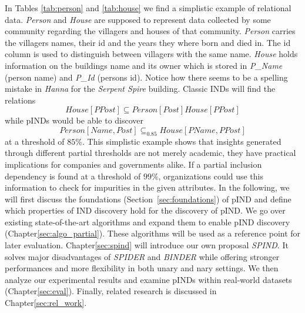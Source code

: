 In Tables \ref{tab:person} and \ref{tab:house} we find a simplistic example of relational data. \textit{Person} and \textit{House} are supposed to represent data collected by some community regarding the villagers and houses of that community. \textit{Person} carries the villagers names, their id and the years they where born and died in. The id column is used to distinguish between villagers with the same name. \textit{House} holds information on the buildings name and its owner which is stored in \textit{P\_Name} (person name) and \textit{P\_Id} (persons id). Notice how there seems to be a spelling mistake in \textit{Hanna} for the \textit{Serpent Spire} building. Classic INDs will find the relations $$\textit{House}[\textit{PPost}]\subseteq \textit{Person}[\textit{Post}] \textit{House}[\textit{PPost}]$$ while pINDs would be able to discover $$\textit{Person}[\textit{Name}, \textit{Post}] \subseteq_{0.85} \textit{House}[\textit{PName}, \textit{PPost}]$$ at a threshold of $85\%$. This simplistic example shows that insights generated through different partial thresholds are not merely academic, they have practical implications for companies and governments alike. If a partial inclusion dependency is found at a threshold of $99\%$, organizations could use this information to check for impurities in the given attributes. In the following, we will first discuss the foundations (Section~\ref{sec:foundations}) of pIND and define which properties of IND discovery hold for the discovery of pIND. We go over existing state-of-the-art algorithms and expand them to enable pIND discovery (Chapter\ref{sec:algo_partial}). These algorithms will be used as a reference point for later evaluation. Chapter\ref{sec:spind} will introduce our own proposal \textit{SPIND}. It solves major disadvantages of \textit{SPIDER} \cite{bauckmann2006efficiently} and \textit{BINDER} \cite{papenbrock2015divide} while offering stronger performances and more flexibility in both unary and nary settings. We then analyze our experimental results and examine pINDs within real-world datasets (Chapter\ref{sec:eval}). Finally, related research is discussed in Chapter\ref{sec:rel_work}.